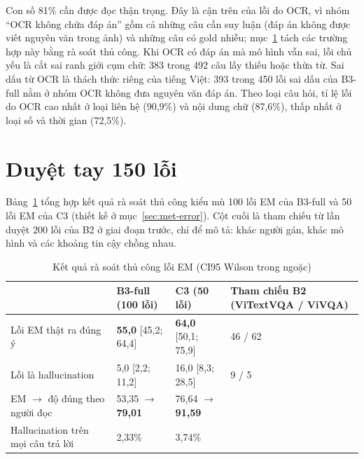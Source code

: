 Con số 81\% cần được đọc thận trọng. Đây là cận trên của lỗi do OCR, vì nhóm ``OCR
không chứa đáp án'' gồm cả những câu cần suy luận (đáp án không được viết nguyên
văn trong ảnh) và những câu có gold nhiễu; mục~\ref{sec:dis-audit} tách các trường
hợp này bằng rà soát thủ công. Khi OCR có đáp án mà mô hình vẫn sai, lỗi chủ yếu là cắt
sai ranh giới cụm chữ: 383 trong 492 câu lấy thiếu hoặc thừa từ. Sai dấu từ OCR là
thách thức riêng của tiếng Việt: 393 trong 450 lỗi sai dấu của B3-full nằm ở
nhóm OCR không đưa nguyên văn đáp án. Theo loại câu hỏi, tỉ lệ lỗi do OCR cao nhất
ở loại liên hệ (90,9\%) và nội dung chữ (87,6\%), thấp nhất ở loại số và thời gian
(72,5\%).

\section{Duyệt tay 150 lỗi}
\label{sec:dis-audit}

Bảng~\ref{tab:dis-audit} tổng hợp kết quả rà soát thủ công kiểu mù 100 lỗi EM của B3-full và
50 lỗi EM của C3 (thiết kế ở mục~\ref{sec:met-error}). Cột cuối là tham chiếu từ
lần duyệt 200 lỗi của B2 ở giai đoạn trước, chỉ để mô tả: khác người gán, khác mô
hình và các khoảng tin cậy chồng nhau.

\begin{table}[htbp]
\caption{Kết quả rà soát thủ công lỗi EM (CI95 Wilson trong ngoặc)}
\label{tab:dis-audit}
\centering
\small
\begin{tabular}{p{}p{}p{}p{}}
\toprule
 & \textbf{B3-full (100 lỗi)} & \textbf{C3 (50 lỗi)} & \textbf{Tham chiếu B2 (ViTextVQA / ViVQA)} \\
\midrule
Lỗi EM thật ra đúng ý & \textbf{55,0} [45,2; 64,4] & \textbf{64,0} [50,1; 75,9] & 46 / 62 \\
Lỗi là hallucination & 5,0 [2,2; 11,2] & 16,0 [8,3; 28,5] & 9 / 5 \\
EM $\to$ độ đúng theo người đọc & 53,35 $\to$ \textbf{79,01} & 76,64 $\to$ \textbf{91,59} & \\
Hallucination trên mọi câu trả lời & 2,33\% & 3,74\% & \\
\bottomrule
\end{tabular}
\end{table}

